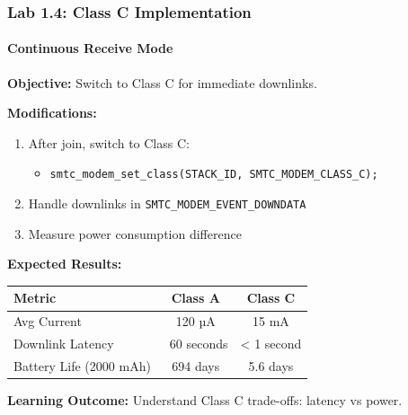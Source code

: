\documentclass{beamer}
\begin{document}
\begin{frame}
\frametitle{Lab 1.4: Class C Implementation}
\framesubtitle{Continuous Receive Mode}

\textbf{Objective:} Switch to Class C for immediate downlinks.

\textbf{Modifications:}
\begin{enumerate}
    \item After join, switch to Class C:
    \begin{itemize}
        \item \texttt{smtc_modem_set_class(STACK_ID, SMTC_MODEM_CLASS_C);}
    \end{itemize}
    \item Handle downlinks in \texttt{SMTC\_MODEM\_EVENT\_DOWNDATA}
    \item Measure power consumption difference
\end{enumerate}

\vspace{1em}

\textbf{Expected Results:}
\begin{table}
\footnotesize
\begin{tabular}{|l|c|c|}
\hline
\textbf{Metric} & \textbf{Class A} & \textbf{Class C} \\
\hline
Avg Current & 120 µA & 15 mA \\
Downlink Latency & ~60 seconds & < 1 second \\
Battery Life (2000 mAh) & 694 days & 5.6 days \\
\hline
\end{tabular}
\end{table}

\textbf{Learning Outcome:} Understand Class C trade-offs: latency vs power.
\end{frame}
\end{document}
